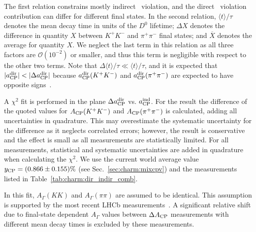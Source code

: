 The first relation constrains mostly indirect \cp\ violation, and the 
direct \cp\ violation contribution can differ for different final states. 
In the second relation, $\langle t\rangle/\tau$ denotes the mean decay 
time in units of the $D^0$ lifetime; $\Delta X$ denotes the difference 
in quantity $X$ between $K^+K^-$ and $\pi^+\pi^-$ final states; and $\overline{X}$ 
denotes the average for quantity $X$. 
We neglect the last term in this relation as all three factors are 
$\mathcal{O}(10^{-2})$ or smaller, and thus this term is negligible 
with respect to the other two terms. 
Note that $\Delta\langle t\rangle/\tau \ll\langle t\rangle/\tau$, and 
it is expected that $|a_{\rm CP}^{\rm dir}| < |\Delta a_{\rm CP}^{\rm dir}|$ 
because $a_{\rm CP}^{\rm dir}(K^+K^-)$ and $a_{\rm CP}^{\rm dir}(\pi^+\pi^-)$ 
are expected to have opposite signs~\cite{Grossman:2006jg}. 

A $\chi^2$ fit is performed in the plane $\Delta a_{\rm CP}^{\rm dir}$ 
vs. $a_{\rm CP}^{\rm ind}$. 
For the \babar result the difference of the quoted values for 
$A_{\rm CP}(K^+K^-)$ and $A_{\rm CP}(\pi^+\pi^-)$ is calculated, 
adding all uncertainties in quadrature. 
This may overestimate the systematic uncertainty for the difference 
as it neglects correlated errors; however, the result is conservative 
and the effect is small as all measurements are statistically limited. 
For all measurements, statistical and systematic uncertainties are added 
in quadrature when calculating the $\chi^2$. 
We use the current world average value $y_{\rm CP} = (0.866 \pm 0.155)\%$ 
(see Sec.~\ref{sec:charm:mixcpv}) and the measurements listed in 
Table~\ref{tab:charm:dir_indir_comb}. 

In this fit, $A_\Gamma(KK)$ and $A_\Gamma(\pi\pi)$ are assumed to be identical.
This assumption is supported by the most recent LHCb measurements~\cite{Aaij:2013ria}.
A significant relative shift due to final-state dependent $A_\Gamma$ values between $\Delta A_{\rm CP}$ measurements with different mean decay times is excluded by these measurements.

